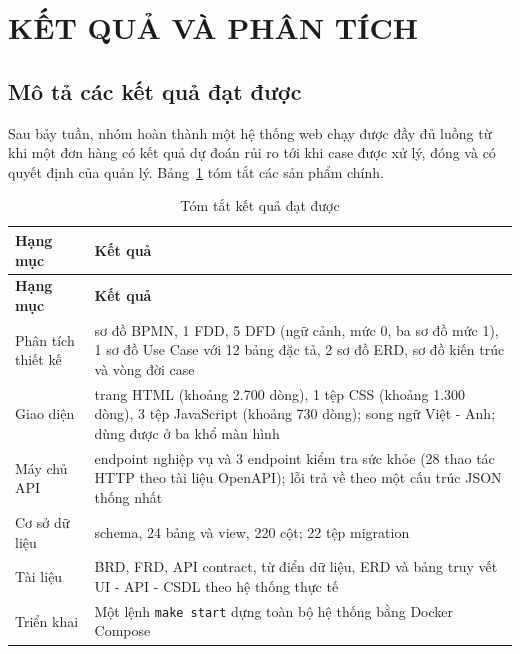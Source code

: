 
\section{KẾT QUẢ VÀ PHÂN TÍCH}

\subsection{Mô tả các kết quả đạt được}

Sau bảy tuần, nhóm hoàn thành một hệ thống web chạy được đầy đủ luồng từ khi một đơn hàng có kết
quả dự đoán rủi ro tới khi case được xử lý, đóng và có quyết định của quản lý. Bảng~\ref{tab:ket-qua}
tóm tắt các sản phẩm chính.

{\small
\renewcommand{\arraystretch}{1.25}
\begin{longtable}{|>{\raggedright\arraybackslash}p{4cm}|>{\raggedright\arraybackslash}p{10.8cm}|}
\caption{Tóm tắt kết quả đạt được}\label{tab:ket-qua}\\ \hline
\textbf{Hạng mục} & \textbf{Kết quả} \\ \hline \endfirsthead
\hline \textbf{Hạng mục} & \textbf{Kết quả} \\ \hline \endhead
Phân tích thiết kế & 8 sơ đồ BPMN, 1 FDD, 5 DFD (ngữ cảnh, mức 0, ba sơ đồ mức 1), 1 sơ đồ Use Case với 12 bảng đặc tả, 2 sơ đồ ERD, sơ đồ kiến trúc và vòng đời case \\ \hline
Giao diện & 9 trang HTML (khoảng 2.700 dòng), 1 tệp CSS (khoảng 1.300 dòng), 3 tệp JavaScript (khoảng 730 dòng); song ngữ Việt - Anh; dùng được ở ba khổ màn hình \\ \hline
Máy chủ API & 23 endpoint nghiệp vụ và 3 endpoint kiểm tra sức khỏe (28 thao tác HTTP theo tài liệu OpenAPI); lỗi trả về theo một cấu trúc JSON thống nhất \\ \hline
Cơ sở dữ liệu & 2 schema, 24 bảng và view, 220 cột; 22 tệp migration \\ \hline
Tài liệu & BRD, FRD, API contract, từ điển dữ liệu, ERD và bảng truy vết UI - API - CSDL theo hệ thống thực tế \\ \hline
Triển khai & Một lệnh \texttt{make start} dựng toàn bộ hệ thống bằng Docker Compose \\ \hline
\end{longtable}
}

